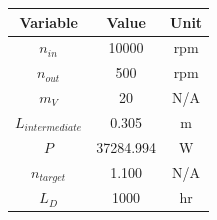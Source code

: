 \begin{tabular}{|c|c|c|}
\hline
Variable & Value & Unit \\ \hline

$n_{in}$ & 10000 & rpm \\ \hline
$n_{out}$ & 500 & rpm \\ \hline
$m_V$ & 20 & N/A \\ \hline
$L_{intermediate}$ & 0.305 & m \\ \hline
$P$ & 37284.994 & W \\ \hline
$n_{target}$ & 1.100 & N/A \\ \hline
$L_D$ & 1000 & hr \\ \hline

\end{tabular}
